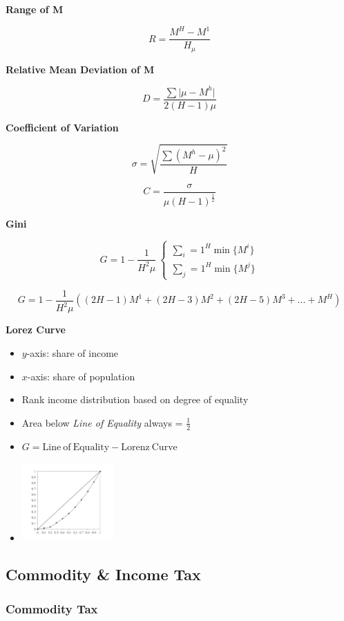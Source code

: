 \documentclass[11pt, english]{article}
\begin{document}
	\textbf{Range of M}

	$$R=\frac{M^H-M^1}{H_{\mu}}$$

	\textbf{Relative Mean Deviation of M}

	$$D=\frac{\sum\vert\mu-M^h\vert}{2(H-1)\mu}$$

	\textbf{Coefficient of Variation}

	$$\sigma=\sqrt{\frac{\sum(M^h-\mu)^2}{H}}$$

	$$C=\frac{\sigma}{\mu(H-1)^{\frac{1}{2}}}$$

	\textbf{Gini}

	$$G=1-\frac{1}{H^2\mu}\ \left\{\begin{matrix}\sum_i=1^H\min\{M^i\}\\\sum_j=1^H\min\{M^j\}\end{matrix}\right.$$

	$$G=1-\frac{1}{H^2\mu}((2H-1)M^1+(2H-3)M^2+(2H-5)M^3+...+M^H)$$

	\textbf{Lorez Curve}

	\begin{itemize}
	\setlength\itemsep{0cm}
		\item $y$-axis: share of income
		\item $x$-axis: share of population
		\item Rank income distribution based on degree of equality
		\item Area below \textit{Line of Equality} always = $\frac{1}{2}$
		\item $G=\mathrm{Line\ of\ Equality}-\mathrm{Lorenz\ Curve}$
		\item \includegraphics[width=3.5cm,height=3cm]{EC315-IMG/31.png}
	\end{itemize}

	\subsection{Commodity \& Income Tax}

		\subsubsection{Commodity Tax}
\end{document}
